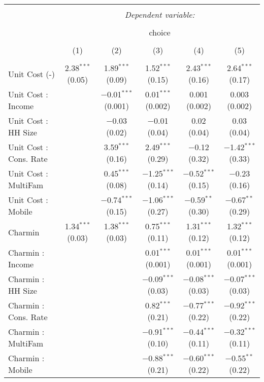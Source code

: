 
\begin{table}[!htbp] \centering 
  \caption{} 
  \label{tab:mnlDallasObsHet} 
\begin{tabular}{@{\extracolsep{5pt}}lccccc} 
\\[-1.8ex]\hline 
\hline \\[-1.8ex] 
 & \multicolumn{5}{c}{\textit{Dependent variable:}} \\ 
\cline{2-6} 
\\[-1.8ex] & \multicolumn{5}{c}{choice} \\ 
\\[-1.8ex] & (1) & (2) & (3) & (4) & (5)\\ 
\hline \\[-1.8ex] 
 Unit Cost (-) & 2.38$^{***}$ (0.05) & 1.89$^{***}$ (0.09) & 1.52$^{***}$ (0.15) & 2.43$^{***}$ (0.16) & 2.64$^{***}$ (0.17) \\ 
  Unit Cost : Income &  & $-$0.01$^{***}$ (0.001) & 0.01$^{***}$ (0.002) & 0.001 (0.002) & 0.003 (0.002) \\ 
  Unit Cost : HH Size &  & $-$0.03 (0.02) & $-$0.01 (0.04) & 0.02 (0.04) & 0.03 (0.04) \\ 
  Unit Cost : Cons. Rate &  & 3.59$^{***}$ (0.16) & 2.49$^{***}$ (0.29) & $-$0.12 (0.32) & $-$1.42$^{***}$ (0.33) \\ 
  Unit Cost : MultiFam &  & 0.45$^{***}$ (0.08) & $-$1.25$^{***}$ (0.14) & $-$0.52$^{***}$ (0.15) & $-$0.23 (0.16) \\ 
  Unit Cost : Mobile &  & $-$0.74$^{***}$ (0.15) & $-$1.06$^{***}$ (0.27) & $-$0.59$^{**}$ (0.30) & $-$0.67$^{**}$ (0.29) \\ 
  Charmin & 1.34$^{***}$ (0.03) & 1.38$^{***}$ (0.03) & 0.75$^{***}$ (0.11) & 1.31$^{***}$ (0.12) & 1.32$^{***}$ (0.12) \\ 
  Charmin : Income &  &  & 0.01$^{***}$ (0.001) & 0.01$^{***}$ (0.001) & 0.01$^{***}$ (0.001) \\ 
  Charmin : HH Size &  &  & $-$0.09$^{***}$ (0.03) & $-$0.08$^{***}$ (0.03) & $-$0.07$^{***}$ (0.03) \\ 
  Charmin : Cons. Rate &  &  & 0.82$^{***}$ (0.21) & $-$0.77$^{***}$ (0.22) & $-$0.92$^{***}$ (0.22) \\ 
  Charmin : MultiFam &  &  & $-$0.91$^{***}$ (0.10) & $-$0.44$^{***}$ (0.11) & $-$0.32$^{***}$ (0.11) \\ 
  Charmin : Mobile &  &  & $-$0.88$^{***}$ (0.21) & $-$0.60$^{***}$ (0.22) & $-$0.55$^{**}$ (0.22) \\ 

\end{tabular}
\end{table}
